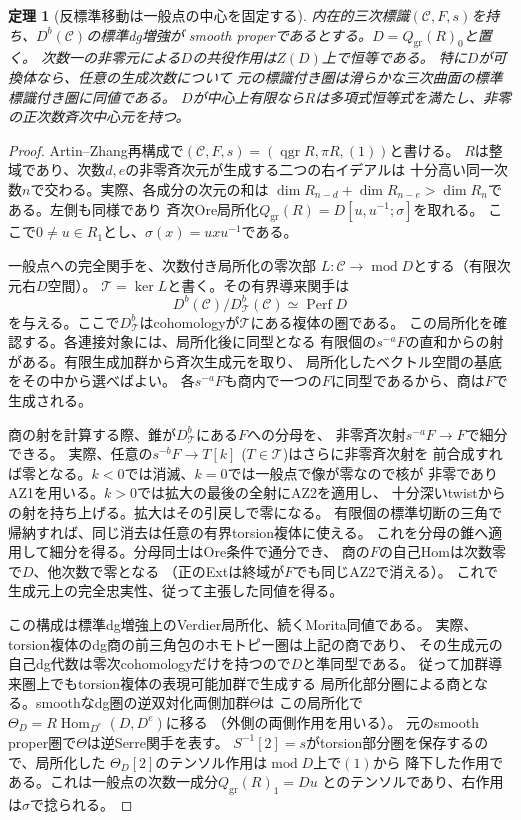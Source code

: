 \documentclass[11pt,a4paper]{ltjsarticle}
\newtheorem{theorem}{定理}[section]
\theoremstyle{definition}
\newcommand{\qgr}{\operatorname{qgr}}
\newcommand{\Perf}{\operatorname{Perf}}
\begin{document}
\begin{theorem}[反標準移動は一般点の中心を固定する]
\label{thm:ou-generic-centre}
内在的三次標識$(\mathcal C,F,s)$を持ち、$D^b(\mathcal C)$の標準dg増強が
smooth properであるとする。$D=Q_{\mathrm{gr}}(R)_0$と置く。
次数一の非零元による$D$の共役作用は$Z(D)$上で恒等である。
特に$D$が可換体なら、任意の生成次数について
元の標識付き圏は滑らかな三次曲面の標準標識付き圏に同値である。
$D$が中心上有限なら$R$は多項式恒等式を満たし、非零の正次数斉次中心元を持つ。
\end{theorem}
\begin{proof}
Artin--Zhang再構成で$(\mathcal C,F,s)=(\qgr R,\pi R,(1))$と書ける。
$R$は整域であり、次数$d,e$の非零斉次元が生成する二つの右イデアルは
十分高い同一次数$n$で交わる。実際、各成分の次元の和は
$\dim R_{n-d}+\dim R_{n-e}>\dim R_n$である。左側も同様であり
斉次Ore局所化$Q_{\mathrm{gr}}(R)=D[u,u^{-1};\sigma]$を取れる。
ここで$0\ne u\in R_1$とし、$\sigma(x)=uxu^{-1}$である。

一般点への完全関手を、次数付き局所化の零次部
$L:\mathcal C\to\operatorname{mod} D$とする（有限次元右$D$空間）。
$\mathcal T=\ker L$と書く。その有界導来関手は
\[
 D^b(\mathcal C)/D^b_{\mathcal T}(\mathcal C)\simeq\Perf D
\]
を与える。ここで$D^b_{\mathcal T}$はcohomologyが$\mathcal T$にある複体の圏である。
この局所化を確認する。各連接対象には、局所化後に同型となる
有限個の$s^{-a}F$の直和からの射がある。有限生成加群から斉次生成元を取り、
局所化したベクトル空間の基底をその中から選べばよい。
各$s^{-a}F$も商内で一つの$F$に同型であるから、商は$F$で生成される。

商の射を計算する際、錐が$D^b_{\mathcal T}$にある$F$への分母を、
非零斉次射$s^{-a}F\to F$で細分できる。
実際、任意の$s^{-b}F\to T[k]$ ($T\in\mathcal T$)はさらに非零斉次射を
前合成すれば零となる。$k<0$では消滅、$k=0$では一般点で像が零なので核が
非零でありAZ1を用いる。$k>0$では拡大の最後の全射にAZ2を適用し、
十分深いtwistからの射を持ち上げる。拡大はその引戻しで零になる。
有限個の標準切断の三角で帰納すれば、同じ消去は任意の有界torsion複体に使える。
これを分母の錐へ適用して細分を得る。分母同士はOre条件で通分でき、
商の$F$の自己Homは次数零で$D$、他次数で零となる
（正のExtは終域が$F$でも同じAZ2で消える）。
これで生成元上の完全忠実性、従って主張した同値を得る。

この構成は標準dg増強上のVerdier局所化、続くMorita同値である。
実際、torsion複体のdg商の前三角包のホモトピー圏は上記の商であり、
その生成元の自己dg代数は零次cohomologyだけを持つので$D$と準同型である。
従って加群導来圏上でもtorsion複体の表現可能加群で生成する
局所化部分圏による商となる。smoothなdg圏の逆双対化両側加群$\Theta$は
この局所化で$\Theta_D=R\operatorname{Hom}_{D^e}(D,D^e)$に移る
\cite[Proposition~3.10(c)]{KellerCY2011}（外側の両側作用を用いる）。
元のsmooth proper圏で$\Theta$は逆Serre関手を表す。
$S^{-1}[2]=s$がtorsion部分圏を保存するので、局所化した
$\Theta_D[2]$のテンソル作用は$\operatorname{mod}D$上で$(1)$から
降下した作用である。これは一般点の次数一成分$Q_{\mathrm{gr}}(R)_1=Du$
とのテンソルであり、右作用は$\sigma$で捻られる。


\end{proof}
\end{document}
